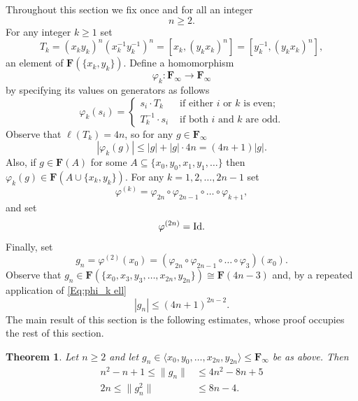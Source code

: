 \documentclass[12pt,reqno,a4paper]{article}
\newtheorem{theorem}{Theorem}[section]
\theoremstyle{definition}
\theoremstyle{remark}
\numberwithin{equation}{section}
\numberwithin{figure}{section}
\newcommand{\B}[1]{{\mathbf #1}}
\begin{document}
Throughout this section we fix once and for all an integer
\[
n\geq 2.
\]
For any integer $k \geq 1$ set
\begin{equation}
T_k = (x_ky_k)^n\left( x_k^{-1}y_k^{-1} \right)^n 
= [x_k,(y_kx_k)^n] = [y_k^{-1},(y_kx_k)^n],
\label{Eq:2-commutators}
\end{equation}
an element of $\B F(\{x_k,y_k\})$.
Define a homomorphism 
\[
\varphi_k\colon \B F_{\infty}\to \B F_{\infty}
\]
by specifying its values on generators as follows
\begin{equation}
\varphi_k(s_i) =
\begin{cases}
s_i\cdot T_k & \text{ if either $i$ or $k$ is even;}\\
T_k^{-1}\cdot s_i & \text{ if both $i$ and $k$ are odd.}
\end{cases}
\label{Eq:function-fi}
\end{equation}
Observe that $\ell(T_k)=4n$, so for any $g \in \B F_\infty$ 
\begin{equation}\label{Eq:phi_k ell}
| \varphi_k(g)| \leq |g|+|g| \cdot 4n = (4n+1)|g|.
\end{equation}
Also, if $g \in \B F(A)$ for some $A \subseteq \{x_0,y_0, x_1,y_1, \dots\}$ then $\varphi_k(g) \in \B F(A \cup \{x_k,y_k\})$.
For any $k=1,2,\ldots,2n-1$ set
\[
\varphi^{(k)} = \varphi_{2n}\circ\varphi_{2n-1}\circ \dots \circ \varphi_{k+1},
\]
and set
\[
\varphi^{(2n)}={\rm Id}.
\]
Finally, set
\begin{equation}
g_n = \varphi^{(2)}(x_0)=
\left(\varphi_{2n}\circ \varphi_{2n-1}\circ \dots \circ \varphi_3\right)(x_0).
\label{Eq:gn}
\end{equation}
Observe that $g_n \in \B F(\{x_0, x_3,y_3,\dots,x_{2n},y_{2n}\}) \cong \B F(4n-3)$ and, by a repeated application of \eqref{Eq:phi_k ell}
\begin{equation}\label{Eq:ell g_n}
|g_n | \leq (4n+1)^{2n-2}.
\end{equation}
The main result of this section is the following estimates,
whose proof occupies the rest of this section.

\begin{theorem}\label{T:bounds}
Let $n\geq 2$ and let $g_n\in\langle x_0,y_0, \dots, x_{2n},y_{2n} \rangle \leq \B F_\infty$ be as above. Then
\begin{align}
n^2-n+1 \leq \|g_n\|   &\leq 4n^2-8n+5 \label{Eq:norm-gn}\\
2n\leq \|g_n^2\| &\leq 8n-4 \label{Eq:norm-gn2}.
\end{align}
\end{theorem}
\end{document}

